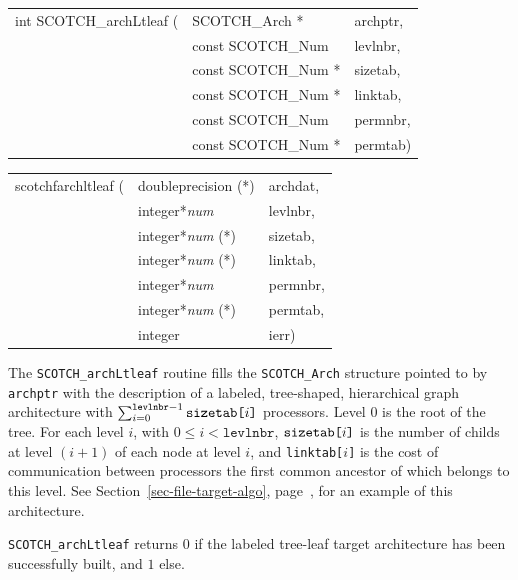\begin{itemize}
\progsyn

{\tt\begin{tabular}{l@{}ll}
int SCOTCH\_archLtleaf ( & SCOTCH\_Arch *      & archptr, \\
                         & const SCOTCH\_Num   & levlnbr, \\
                         & const SCOTCH\_Num * & sizetab, \\
                         & const SCOTCH\_Num * & linktab, \\
                         & const SCOTCH\_Num   & permnbr, \\
                         & const SCOTCH\_Num * & permtab)
\end{tabular}}

{\tt\begin{tabular}{l@{}ll}
scotchfarchltleaf ( & doubleprecision (*)    & archdat, \\
                    & integer*{\it num}      & levlnbr, \\
                    & integer*{\it num} (*)  & sizetab, \\
                    & integer*{\it num} (*)  & linktab, \\
                    & integer*{\it num}      & permnbr, \\
                    & integer*{\it num} (*)  & permtab, \\
                    & integer                & ierr)
\end{tabular}}

\progdes

The {\tt SCOTCH\_archLtleaf} routine fills the {\tt SCOTCH\_\lbt Arch}
structure pointed to by {\tt archptr} with the description of a
labeled, tree-shaped, hierarchical graph architecture with
$\sum_{i=0}^{\mathtt{levlnbr}-1}\mathtt{sizetab}\mbox{\tt [}i\mbox{\tt ]}$
processors. Level $0$ is the root of the tree. For each level $i$,
with $0 \leq i < \mathtt{levlnbr}$, $\mathtt{sizetab}\mbox{\tt [}i\mbox{\tt
]}$ is the number of childs at level $(i+1)$ of each node at level $i$,
and {\tt linktab[}$i${\tt ]} is the cost of communication between
processors the first common ancestor of which belongs to this
level. See Section~\ref{sec-file-target-algo},
page~\pageref{sec-file-target-ltleaf}, for an example of this
architecture.

\progret

{\tt SCOTCH\_archLtleaf} returns $0$ if the labeled tree-leaf target
architecture has been successfully built, and $1$ else.
\end{itemize}

